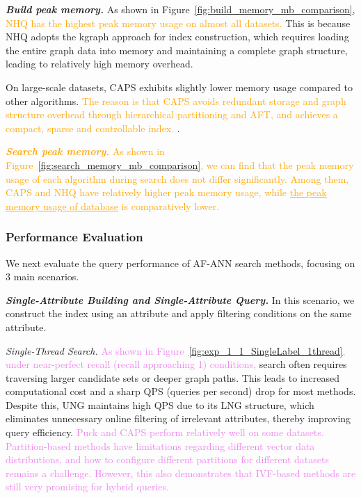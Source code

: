 \documentclass[sigconf, nonacm]{acmart}
\begin{document}
	
	
	\textit{\textbf{Build peak memory.}}
	As shown in Figure~\ref{fig:build_memory_mb_comparison}, 
	\textcolor{orange}{NHQ has the highest peak memory usage on almost all datasets.}
	This is because NHQ adopts the kgraph approach for index construction, which requires loading the entire graph data into memory and maintaining a complete graph structure, leading to relatively high memory overhead. 
	
	On large-scale datasets, CAPS exhibits slightly lower memory usage compared to other algorithms. \textcolor{orange}{The reason is that CAPS avoids redundant storage and graph structure overhead through hierarchical partitioning and AFT, and achieves a compact, sparse and controllable index. }.
	
	\textit{\textbf{ \textcolor{orange}{Search peak memory.}}}
	 \textcolor{orange}{As shown in Figure~\ref{fig:search_memory_mb_comparison}, we can find that the peak memory usage of each algorithm during search does not differ significantly. Among them, CAPS and NHQ have relatively higher peak memory usage, while \underline{the peak memory usage of database} is comparatively lower.}
	
	\subsubsection{Performance Evaluation}
	
	
	
	
	We next evaluate the query performance of AF-ANN search methods, focusing on 3 main scenarios.
	
	\textit{\textbf{Single-Attribute Building and Single-Attribute Query.}}
	In this scenario, we construct the index using an attribute and apply filtering conditions on the same attribute.
	
	
	\textit{Single-Thread Search.}  
	\textcolor{violet}{As shown in Figure~\ref{fig:exp_1_1_SingleLabel_1thread}, under near-perfect recall (recall approaching 1) conditions,} search often requires traversing larger candidate sets or deeper graph paths. This leads to increased computational cost and a sharp QPS (queries per second) drop for most methods. Despite this, UNG maintains high QPS due to its LNG structure, which eliminates unnecessary online filtering of irrelevant attributes, thereby improving query efficiency. \textcolor{violet}{Puck and CAPS perform relatively well on some datasets. Partition-based methods have limitations regarding different vector data distributions, and how to configure different partitions for different datasets remains a challenge. However, this also demonstrates that IVF-based methods are still very promising for hybrid queries.}
	
\end{document}
